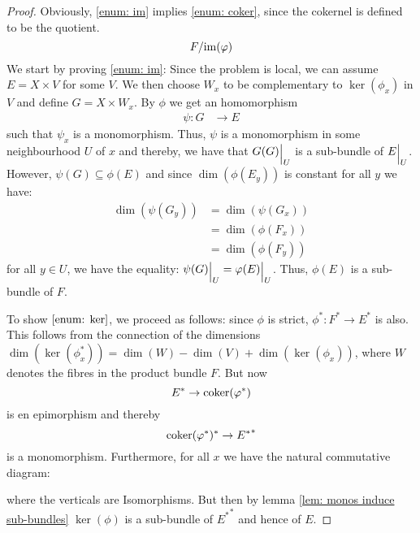 \begin{proof}
	Obviously, \ref{enum: im} implies \ref{enum: coker}, since the cokernel is defined to be the quotient.
	\begin{equation*}
		F\slash \mathrm{im}(\varphi)
	\end{equation*}
	We start by proving \ref{enum: im}:
	Since the problem is local, we can assume $E=X\times V$ for some $V$. We then choose $W_x$ to be complementary to $\ker(\phi_x)$ in $V$ and define $G=X\times W_x$. By $\phi$ we get an homomorphism
	\begin{align*}
		\psi: G&\to E
	\end{align*} such that $\psi_x$ is a monomorphism. Thus, $\psi$ is a monomorphism in some neighbourhood $U$ of $x$ and thereby, we have that ${G(G)}\einsch{U}$ is a sub-bundle of ${E}\einsch{U}$. However, $\psi(G)\subseteq \phi(E)$ and since $\dim(\phi(E_y))$ is constant for all $y$ we have:
	\begin{align*}
		\dim(\psi(G_y))&=\dim(\psi(G_x))\\
		&=\dim(\phi(F_x))\\
		&=\dim(\phi(F_y))
	\end{align*}for all $y\in U$, we have the equality: ${\psi(G)}\einsch{U}={\phi(E)}\einsch{U}$. Thus, $\phi(E)$ is a sub-bundle of $F$.
	
	
	To show $\ref{enum: ker}$, we proceed as follows: since $\phi$ is strict, $\phi^*:F^*\to E^*$ is also. 
	This follows from the connection of the dimensions $\dim(\ker(\phi_x^*))=\dim(W)-\dim(V)+\dim(\ker(\phi_x))$, where $W$ denotes the fibres in the product bundle $F$. But now 
	\begin{equation*}
		E^*\to \operatorname{\mathrm{coker}}(\varphi^*)
	\end{equation*} is en epimorphism and thereby 
	\begin{equation*}
		\operatorname{\mathrm{coker}}(\varphi^*)^* \to {E^*}^*
	\end{equation*} is a monomorphism. Furthermore, for all $x$ we have the natural commutative diagram:
	\begin{center}
	\end{center} where the verticals are Isomorphisms. But then by lemma \ref{lem: monos induce sub-bundles} $\ker(\phi)$ is a sub-bundle of ${E^*}^*$ and hence of $E$.
\end{proof}
